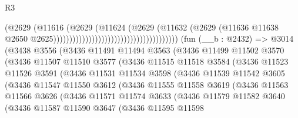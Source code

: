\begin{lexlean}{R3}
\begin{coremodule}
                                                                  (@2629
                                                                    (@11616
                                                                      (@2629
                                                                        (@11624
                                                                          (@2629
                                                                            (@11632
                                                                              (@2629
                                                                                (@11636
                                                                                  @11638
                                                                                  @2650
                                                                                  @2625)))))))))))))))))))))))))))))))))))))))
    (fun (__b : @2432) =>
    @3014
      (@3438
        @3556
        (@3436
          @11491
          @11494
          @3563
          (@3436
            @11499
            @11502
            @3570
            (@3436
              @11507
              @11510
              @3577
              (@3436
                @11515
                @11518
                @3584
                (@3436
                  @11523
                  @11526
                  @3591
                  (@3436
                    @11531
                    @11534
                    @3598
                    (@3436
                      @11539
                      @11542
                      @3605
                      (@3436
                        @11547
                        @11550
                        @3612
                        (@3436
                          @11555
                          @11558
                          @3619
                          (@3436
                            @11563
                            @11566
                            @3626
                            (@3436
                              @11571
                              @11574
                              @3633
                              (@3436
                                @11579
                                @11582
                                @3640
                                (@3436
                                  @11587
                                  @11590
                                  @3647
                                  (@3436
                                    @11595
                                    @11598

\end{coremodule}
\end{lexlean}

